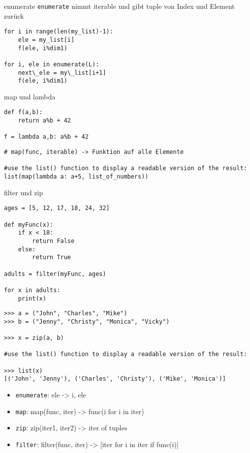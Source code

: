 \begin{frame}[fragile]{enumerate}
\texttt{enumerate} nimmt iterable und gibt tuple von Index und Element zurück
\begin{lstlisting}
for i in range(len(my_list)-1):
	ele = my_list[i]
	f(ele, i%dim1)

for i, ele in enumerate(L):
	next\_ele = my\_list[i+1]
	f(ele, i%dim1)
\end{lstlisting}
\end{frame}

\begin{frame}[fragile]{map und lambda}
\begin{lstlisting}
def f(a,b):
	return a%b + 42
	
f = lambda a,b: a%b + 42
\end{lstlisting}
\pause 
\begin{lstlisting}
# map(func, iterable) -> Funktion auf alle Elemente

#use the list() function to display a readable version of the result:
list(map(lambda a: a+5, list_of_numbers))

\end{lstlisting}
\end{frame}

\begin{frame}[fragile]{filter und zip}
\begin{lstlisting}
ages = [5, 12, 17, 18, 24, 32]

def myFunc(x):
	if x < 18:
		return False
	else:
		return True

adults = filter(myFunc, ages)

for x in adults:
	print(x) 
\end{lstlisting}
\pause
\begin{lstlisting}
>>> a = ("John", "Charles", "Mike")
>>> b = ("Jenny", "Christy", "Monica", "Vicky")

>>> x = zip(a, b)

#use the list() function to display a readable version of the result:

>>> list(x)
[('John', 'Jenny'), ('Charles', 'Christy'), ('Mike', 'Monica')]

\end{lstlisting}
\end{frame}

\begin{frame}
	\begin{itemize}
		\item \texttt{enumerate}: ele -> i, ele
		\item \texttt{map}: map(func, iter) -> func(i for i in iter)
		\item \texttt{zip}: zip(iter1, iter2) -> iter of tuples
		\item \texttt{filter}: filter(func, iter) -> [iter for i in iter if func(i)]
	\end{itemize}
\end{frame}

